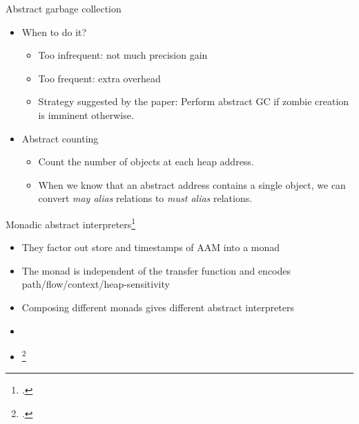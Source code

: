 \documentclass[aspectratio=169]{beamer}
\begin{document}

\begin{frame}{Abstract garbage collection}
  \begin{itemize}[<+->]
  \item When to do it?
    \begin{itemize}
    \item Too infrequent: not much precision gain
    \item Too frequent: extra overhead\pause
    \item Strategy suggested by the paper: Perform abstract GC if zombie creation is imminent otherwise.
    \end{itemize}
  \item Abstract counting
    \begin{itemize}
    \item Count the number of objects at each heap address.
    \item When we know that an abstract address contains a single object, we can convert \emph{may alias} relations to \emph{must alias} relations.
    \end{itemize}
  \end{itemize}
\end{frame}

\begin{frame}{Monadic abstract interpreters\footcite{sergey2013monadic}}
  \begin{itemize}
  \item They factor out store and timestamps of AAM into a monad
  \item The monad is independent of the transfer function and encodes path/flow/context/heap-sensitivity
  \item Composing different monads gives different abstract interpreters
  \item {}
  \item {}\footcite{darais2015galois}
  \end{itemize}
\end{frame}
\end{document}
